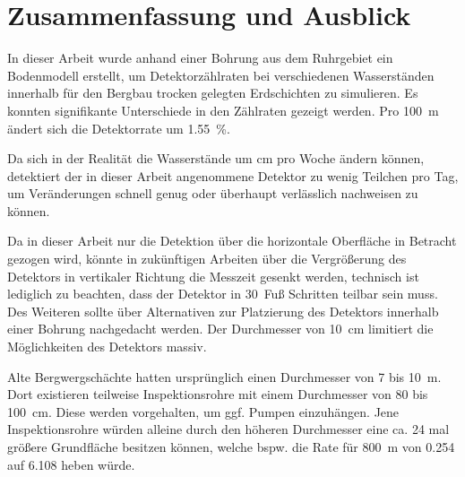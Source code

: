 \chapter{Zusammenfassung und Ausblick}


In dieser Arbeit wurde anhand einer Bohrung aus dem Ruhrgebiet ein Bodenmodell erstellt,
um Detektorzählraten bei verschiedenen Wasserständen innerhalb
für den Bergbau trocken gelegten Erdschichten zu simulieren.
Es konnten signifikante Unterschiede in den Zählraten gezeigt werden.
Pro \SI[]{100}[]{m} ändert sich die Detektorrate um \SI[]{1,55}[]{\%}.


Da sich in der Realität die Wasserstände um \si[]{cm} pro Woche ändern können,
detektiert der in dieser Arbeit angenommene Detektor zu wenig Teilchen pro Tag,
um Veränderungen schnell genug oder überhaupt verlässlich nachweisen zu können.

Da in dieser Arbeit nur die Detektion über die horizontale Oberfläche in Betracht gezogen wird,
könnte in zukünftigen Arbeiten über die Vergrößerung des Detektors in vertikaler Richtung
die Messzeit gesenkt werden, technisch ist lediglich zu beachten, dass der Detektor in 
\SI[]{30}[]{Fuß} Schritten teilbar sein muss. 
Des Weiteren sollte über Alternativen zur Platzierung des Detektors innerhalb
einer Bohrung nachgedacht werden. Der Durchmesser von \SI[]{10}[]{cm} 
limitiert die Möglichkeiten des Detektors massiv.

Alte Bergwergschächte hatten ursprünglich einen Durchmesser von \num[]{7} bis \SI[]{10}[]{m}.
Dort existieren teilweise Inspektionsrohre mit einem Durchmesser von \num[]{80} bis \SI[]{100}[]{cm}.
Diese werden vorgehalten, um ggf. Pumpen einzuhängen. Jene Inspektionsrohre würden alleine durch den höheren
Durchmesser eine ca. \num[]{24} mal größere Grundfläche besitzen können, welche
bspw. die Rate für \SI[]{800}[]{m} von 
\SI[]{0.254}[]{} auf 
\SI[]{6.108}[]{} heben würde.




